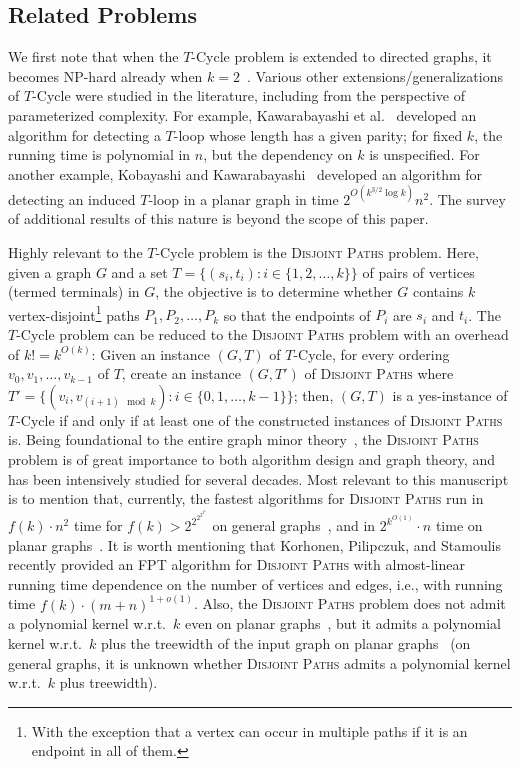 \documentclass{article}
\numberwithin{claimcounter}{lemma}
\newcommand{\dispaths}{\textsc{Disjoint Paths}\xspace}
\begin{document}
\subsection{Related Problems} We first note that when the {\sc $T$-Cycle} problem is extended to directed graphs, it becomes NP-hard already when $k=2$~\cite{fortune1980directed}.
Various other extensions/generalizations of {\sc $T$-Cycle} were studied in the literature, including from the perspective of parameterized complexity. For example, Kawarabayashi et al.~\cite{kawarabayashi2010recognizing} developed an algorithm for detecting a $T$-loop whose length has a given parity; for fixed $k$, the running time is polynomial in $n$, but the dependency on $k$ is unspecified. For another example, Kobayashi and Kawarabayashi~\cite{kobayashi2009algorithms} developed an algorithm for detecting an induced $T$-loop in a planar graph in time $2^{O(k^{3/2}\log k)}n^2$.  The survey of additional results of this nature is beyond the scope of this paper.

Highly relevant to the {\sc $T$-Cycle} problem is the \dispaths problem. Here, given a graph $G$ and a set $T=\{(s_i,t_i): i\in\{1,2,\ldots,k\}\}$ of pairs of vertices (termed terminals) in $G$, the objective is to determine whether $G$ contains $k$ vertex-disjoint\footnote{With the exception that a vertex can occur in multiple paths if it is an endpoint in all of them.} paths $P_1,P_2,\ldots,P_k$ so that the endpoints of $P_i$ are $s_i$ and $t_i$. The {\sc $T$-Cycle} problem can be reduced to the \dispaths problem with an overhead of $k!=k^{O(k)}$: Given an instance $(G,T)$ of {\sc $T$-Cycle}, for every ordering $v_0,v_1,\ldots,v_{k-1}$ of $T$, create an instance $(G,T')$ of \dispaths where $T'=\{(v_i,v_{(i+1)\mod k}): i\in\{0,1,\ldots,k-1\}\}$; then, $(G,T)$ is a yes-instance of {\sc $T$-Cycle} if and only if at least one of the constructed instances of \dispaths is. Being foundational to the entire graph minor theory~\cite{DBLP:conf/birthday/Lokshtanov0Z20}, the \dispaths problem is of great importance to both algorithm design and graph theory, and has been intensively studied for several decades. Most relevant to this manuscript is to mention that, currently, the fastest algorithms for \dispaths run in $f(k)\cdot n^2$ time for $f(k)>2^{2^{2^{2^{2^k}}}}$ on general graphs~\cite{DBLP:journals/jct/KawarabayashiKR12}, and in $2^{k^{O(1)}}\cdot n$ time on planar graphs~\cite{cho2023parameterized}. It is worth mentioning that  Korhonen, Pilipczuk, and Stamoulis~\cite{korhonen2024minor} recently provided an FPT algorithm for \textsc{Disjoint Paths} with almost-linear running time dependence on the number of vertices and edges, i.e., with running time $f(k)\cdot (m+n)^{1+o(1)}$. Also, the \dispaths problem does not admit a polynomial kernel w.r.t.~$k$ even on planar graphs~\cite{DBLP:conf/focs/0001Z23}, but it admits a polynomial kernel w.r.t.~$k$ plus the treewidth of the input graph on planar graphs~\cite{DBLP:conf/focs/0001Z23} (on general graphs, it is unknown whether \dispaths admits a polynomial kernel w.r.t.~$k$ plus treewidth).
\end{document}
